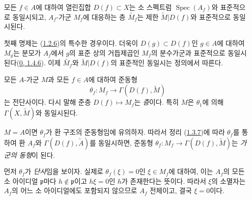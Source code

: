 \begin{proposition}[1.3.6]
\label{I.1.3.6-ko}
모든 $f\in A$에 대하여 열린집합 $D(f)\subset X$는 소 스펙트럼
$\operatorname{Spec}(A_f)$와 표준적으로 동일시되고, $A_f$-가군
$M_f$에 대응하는 층 $\widetilde{M_f}$는 제한
$\widetilde{M}|D(f)$와 표준적으로 동일시된다.
\end{proposition}

첫째 명제는 (\hyperref[I.1.2.6-ko]{1.2.6})의 특수한 경우이다.
더욱이 $D(g)\subset D(f)$인 $g\in A$에 대하여 $M_g$는 분모가
$A_f$에서 $g$의 표준 상의 거듭제곱인 $M_f$의 분수가군과
표준적으로 동일시된다(\hyperref[0.1.4.6-ko]{0, 1.4.6}). 이제
$\widetilde{M_f}$와 $\widetilde{M}|D(f)$의 표준적인 동일시는
정의에서 따른다.

\begin{theorem}[1.3.7]
\label{I.1.3.7-ko}
모든 $A$-가군 $M$과 모든 $f\in A$에 대하여 준동형
\[
  \theta_f:M_f\longrightarrow\Gamma(D(f),\widetilde{M})
\]
는 전단사이다. 다시 말해 준층 $D(f)\mapsto M_f$는 \emph{층}이다.
특히 $M$은 $\theta_1$에 의해 $\Gamma(X,\widetilde{M})$와
동일시된다.
\end{theorem}

$M=A$이면 $\theta_f$가 환 구조의 준동형임에 유의하자. 따라서
정리 (\hyperref[I.1.3.7-ko]{1.3.7})에 따라 $\theta_f$를 통하여
환 $A_f$와 $\Gamma(D(f),\widetilde{A})$를 동일시하면, 준동형
$\theta_f:M_f\to\Gamma(D(f),\widetilde{M})$는 \emph{가군의 동형}이
된다.

먼저 $\theta_f$가 \emph{단사}임을 보이자. 실제로
$\theta_f(\xi)=0$인 $\xi\in M_f$에 대하여, 이는 $A_f$의 모든 소
아이디얼 $\mathfrak{p}$마다 $h\notin\mathfrak{p}$이고 $h\xi=0$인
$h$가 존재한다는 뜻이다. 따라서 $\xi$의 소멸자는 $A_f$의 어느 소
아이디얼에도 포함되지 않으므로 $A_f$ 전체이고, 결국 $\xi=0$이다.

